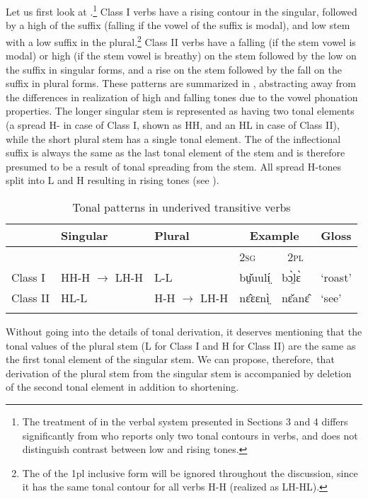 \documentclass[output=paper,newtxmath,modfonts,nonflat,draftmode]{langsci/langscibook}
\begin{document}
Let us first look at .\footnote{The\label{fn:monich:6} treatment of  in the verbal system presented in Sections 3 and 4 differs significantly from \citet{gjersøe2017} who reports only two tonal contours in verbs, and does not distinguish contrast between low and rising tones.} Class I verbs have a rising contour in the singular, followed by a high  of the suffix (falling if the vowel of the suffix is modal), and low stem with a low suffix in the plural.\footnote{The \label{fn:monich:7} of the 1pl inclusive form will be ignored throughout the discussion, since it has the same tonal contour for all verbs H-H (realized as LH-HL).} Class II verbs have a falling  (if the stem vowel is modal) or high (if the stem vowel is breathy)  on the stem followed by the low  on the suffix in singular forms, and a rise on the stem followed by the fall on the suffix in plural forms. These patterns are summarized in , abstracting away from the differences in realization of high and falling tones due to the vowel phonation properties. The longer singular stem is represented as having two tonal elements (a spread H- in case of Class I, shown as HH, and an HL in case of Class II), while the short plural stem has a single tonal element. The  of the inflectional suffix is always the same as the last tonal element of the stem and is therefore presumed to be a result of tonal spreading from the stem. All spread H-tones split into L and H resulting in rising tones (see ). 



\begin{table}[t]
\begin{tabularx}{\textwidth}{lllXXX}
\lsptoprule
 & Singular & Plural & \multicolumn{2}{c}{Example} & Gloss\\
\midrule
&  &  & \scshape 2sg & \multicolumn{1}{c}{\scshape 2pl} & \\
Class I & HH-H $\rightarrow$ LH-H & L-L & bṳ̌uulí̤ & bɔ̤̀lɛ̀ & ‘roast’\\
Class II & HL-L & H-H $\rightarrow$ LH-H & nɛ̂ɛɛnì̤ & nɛ̌anɛ̂ & ‘see’\\
\lspbottomrule
\end{tabularx}
\caption{Tonal patterns in underived transitive verbs}
\label{tab:monich:7}
\end{table}

Without going into the details of tonal derivation, it deserves mentioning that the tonal values of the plural stem (L for Class I and H for Class II) are the same as the first tonal element of the singular stem. We can propose, therefore, that derivation of the plural stem from the singular stem is accompanied by deletion of the second tonal element in addition to shortening.
\end{document}
